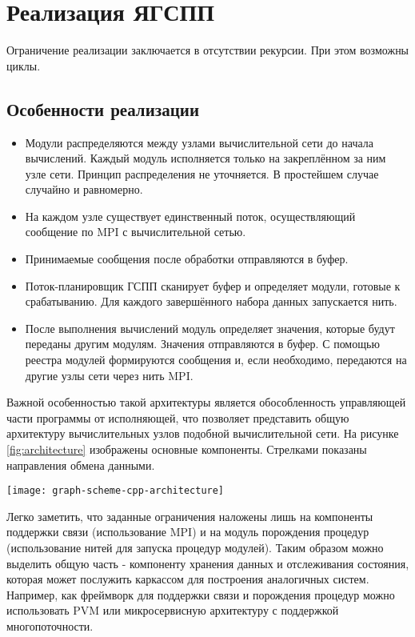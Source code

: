 \chapter{Реализация ЯГСПП}
	Ограничение реализации заключается в отсутствии рекурсии. При этом возможны циклы.

	\section{Особенности реализации}
	\begin{itemize}
		\item Модули распределяются между узлами вычислительной сети до начала вычислений. Каждый модуль исполняется только на закреплённом за ним узле сети. Принцип распределения не уточняется. В простейшем случае случайно и равномерно.
		\item На каждом узле существует единственный поток, осуществляющий сообщение по MPI с вычислительной сетью.
		\item Принимаемые сообщения после обработки отправляются в буфер.
		\item Поток-планировщик ГСПП сканирует буфер и определяет модули, готовые к срабатыванию. Для каждого завершённого набора данных запускается нить. 
		\item После выполнения вычислений модуль определяет значения, которые будут переданы другим модулям. Значения отправляются в буфер. С помощью реестра модулей формируются сообщения и, если необходимо, передаются на другие узлы сети через нить MPI.
	\end{itemize}
	
	Важной особенностью такой архитектуры является обособленность управляющей части программы от исполняющей, что позволяет представить общую архитектуру вычислительных узлов подобной вычислительной сети. На рисунке \ref{fig:architecture} изображены основные компоненты. Стрелками показаны направления обмена данными.
	
			\begin{figure*}[h]
				\centering
				\texttt{[image: graph-scheme-cpp-architecture]}
				\caption{Общая архитектура вычислительных узлов ЯГСПП}
				\label{fig:architecture}
			\end{figure*}
			
	\FloatBarrier
	
	Легко заметить, что заданные ограничения наложены лишь на компоненты поддержки связи (использование MPI) и на модуль порождения процедур (использование нитей для запуска процедур модулей). Таким образом можно выделить общую часть - компоненту хранения данных и отслеживания состояния, которая может послужить каркассом для построения аналогичных систем. Например, как фреймворк для поддержки связи и порождения процедур можно использовать PVM или микросервисную архитектуру с поддержкой многопоточности.
	

